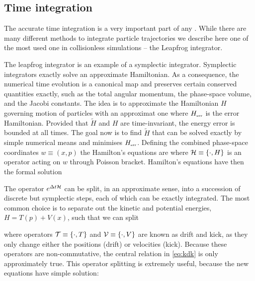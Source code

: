 \subsection{Time integration}
The accurate time integration is a very important part of any \nbodysim. While there are many different methods to integrate particle trajectories \parencite[see e.g.][]{Hockney:1988:CSU:62815} we describe here one of the most used one in collisionless simulations -- the Leapfrog integrator.

The leapfrog integrator is an example of a symplectic integrator. Symplectic integrators exactly solve an approximate Hamiltonian. As a consequence, the numerical time evolution is a canonical map and preserves certain conserved quantities exactly, such as the total angular momentum, the phase-space volume, and the Jacobi constants. The idea is to approximate the Hamiltonian \(H\) governing motion of particles with an approximat one
where \(H_\text{\tiny err}\) is the error Hamiltonian. Provided that \(\tilde H\) and \(H\) are time-invariant, the energy error is bounded at all times. The goal now is to find \(\tilde H\) that can be solved exactly by simple numerical means and minimises \(H_\text{\tiny err}\). Defining the combined phase-space coordinates \(w\equiv(x,p)\) the Hamilton’s equations are
where \(\mathcal{H}\equiv\{\cdot,H\}\) is an operator acting on \(w\) through Poisson bracket. Hamilton’s equations have then the formal solution
\begin{sloppypar}
The operator \(e^{\Delta t\mathcal{H}}\) can be split, in an approximate sense, into a succession of discrete but symplectic steps, each of which can be exactly integrated. The most common choice is to separate out the kinetic and potential energies, \({H=T(p)+V(x)}\), such that we can split
\end{sloppypar}
where operators \(\mathcal{T}\equiv\{\cdot,T\}\) and \(\mathcal{V}\equiv\{\cdot,V\}\) are known as drift and kick, as they only change either the positions (drift) or velocities (kick). Because these operators are non-commutative, the central relation in \eqref{eq:kdk} is only approximately true. This operator splitting is extremely useful, because the new equations have simple solution:
